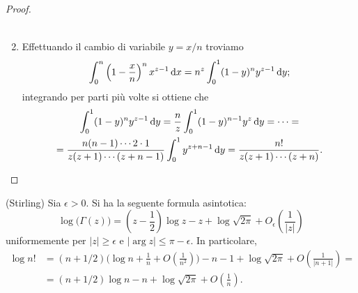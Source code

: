 \begin{proof}
\begin{enumerate}
\begin{gather*}
    \end{gather*}
    \item Effettuando il cambio di variabile $y=x/n$ troviamo
    $$\int_0^n \left(1-\frac{x}{n}\right)^nx^{z-1}\mathop{}\!\mathrm{d} x=n^z\int_0^1(1-y)^ny^{z-1}\mathop{}\!\mathrm{d} y;$$
    integrando per parti più volte si ottiene che
    \begin{gather*}
      \int_0^1 (1-y)^ny^{z-1}\mathop{}\!\mathrm{d} y=\frac{n}{z}\int_0^1 (1-y)^{n-1}y^z\mathop{}\!\mathrm{d} y=\dots= \\
      =\frac{n(n-1)\cdots 2\cdot 1}{z(z+1)\cdots(z+n-1)}\int_0^1 y^{z+n-1}\mathop{}\!\mathrm{d} y=\frac{n!}{z(z+1)\cdots(z+n)}.
    \end{gather*}
  \end{enumerate}
\end{proof}

\begin{thm}
  (Stirling) Sia $\epsilon>0$. Si ha la seguente formula asintotica:
  \begin{equation}
    \log\big(\Gamma(z)\big)=\left(z-\frac{1}{2}\right)\log{z}-z+\log{\sqrt{2\pi}}+O_{\epsilon}\left(\frac{1}{|z|}\right)
  \end{equation}
  uniformemente per $|z| \ge \epsilon$ e $|\arg{z}| \le \pi-\epsilon$. In particolare,
  \begin{align*}
    \log{n!}&=(n+1/2)\Bigg(\log{n}+\frac{1}{n}+O\left(\frac{1}{n^2}\right)\Bigg)-n-1+\log{\sqrt{2\pi}}+O\left(\frac{1}{|n+1|}\right)= \\
    &=(n+1/2)\log{n}-n+\log{\sqrt{2\pi}}+O\left(\frac{1}{n}\right).
  \end{align*}
\end{thm}

